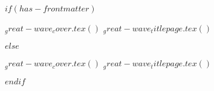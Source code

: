 $if(has-frontmatter)$
  \begin{frontmatter}
    \begin{titlepage}
      $_great-wave_cover.tex()$
      $_great-wave_titlepage.tex()$
    \end{titlepage}
    \setcounter{page}{1}
  \end{frontmatter}
$else$
  \begin{titlepage}
    $_great-wave_cover.tex()$
    $_great-wave_titlepage.tex()$
  \end{titlepage}
$endif$
